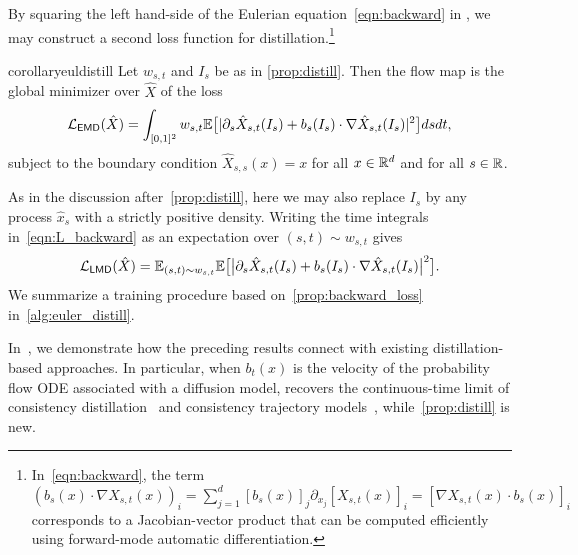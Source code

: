 By squaring the left hand-side of the Eulerian equation~\eqref{eqn:backward} in , we may construct a second loss function for distillation.\footnote{In~\eqref{eqn:backward}, the term
%
$\left(b_s(x)\cdot\nabla X_{s, t}(x)\right)_i = \sum_{j=1}^d [b_s(x)]_j \partial_{x_j}\left[X_{s, t}(x)\right]_i = \left[\nabla X_{s, t}(x)\cdot b_s(x)\right]_i$
%
corresponds to a Jacobian-vector product that can be computed efficiently using forward-mode automatic differentiation.}
\begin{restatable}{corollary}{euldistill}
	\label{prop:backward_loss}
	Let $w_{s,t}$ and $I_s$ be as in \cref{prop:distill}. Then the flow map is the global minimizer over $\hat{X}$ of the loss
	\begin{equation}
		\label{eqn:L_backward}
		\mathcal{L}_{\mathsf{EMD}}(\hat{X}) = \int_{[0,1]^2}w_{s,t} \mathbb{E}\big[|\partial_s \hat{X}_{s, t}(I_s) + b_s(I_s) \cdot \nabla \hat{X}_{s, t}(I_s)|^2\big] dsdt,
	\end{equation}
	subject to the boundary condition $\hat{X}_{s, s}(x) = x$ for all $x \in \mathbb{R}^d$ and for all $s \in \mathbb{R}$.
\end{restatable}
%
As in the discussion after~\cref{prop:distill}, here we may also replace $I_s$ by any process $\hat x_s$ with a strictly positive density.
%
Writing the time integrals in~\eqref{eqn:L_backward} as an expectation over $(s,t) \sim w_{s,t}$ gives
%
\begin{equation}
	\label{eqn:L_backward:b}
	\mathcal{L}_{\mathsf{LMD}}(\hat{X}) = \mathbb{E}_{(s,t)\sim w_{s,t}} \mathbb{E}\big[ \big|\partial_s \hat{X}_{s, t}(I_s) + b_s(I_s) \cdot \nabla \hat{X}_{s, t}(I_s)\big|^2\big].
\end{equation}
%
%
We summarize a training procedure based on~\cref{prop:backward_loss} in~\cref{alg:euler_distill}.

In~, we demonstrate how the preceding results connect with existing distillation-based approaches.
%
In particular, when $b_t(x)$ is the velocity of the probability flow ODE associated with a diffusion model,  recovers the continuous-time limit of consistency distillation~\citep{song_consistency_2023, song_improved_2023} and consistency trajectory models~\citep{kim_consistency_2024}, while~\cref{prop:distill} is new.


